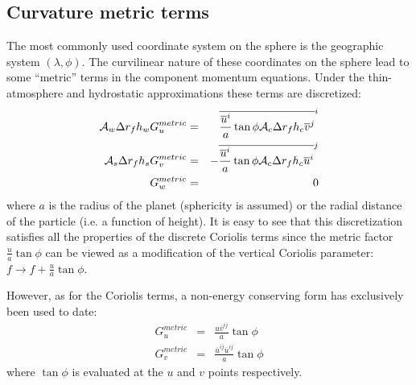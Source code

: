 

\subsection{Curvature metric terms}

The most commonly used coordinate system on the sphere is the
geographic system $(\lambda,\phi)$. The curvilinear nature of these
coordinates on the sphere lead to some ``metric'' terms in the
component momentum equations. Under the thin-atmosphere and
hydrostatic approximations these terms are discretized:
\begin{eqnarray}
{\cal A}_w \Delta r_f h_w G_u^{metric} & = &
  \overline{ \frac{ \overline{u}^i }{a} \tan{\phi} {\cal A}_c \Delta r_f h_c \overline{ v }^j }^i \\
{\cal A}_s \Delta r_f h_s G_v^{metric} & = &
- \overline{ \frac{ \overline{u}^i }{a} \tan{\phi} {\cal A}_c \Delta r_f h_c \overline{ u }^i }^j \\
G_w^{metric} & = & 0
\end{eqnarray}
where $a$ is the radius of the planet (sphericity is assumed) or the
radial distance of the particle (i.e. a function of height).  It is
easy to see that this discretization satisfies all the properties of
the discrete Coriolis terms since the metric factor $\frac{u}{a}
\tan{\phi}$ can be viewed as a modification of the vertical Coriolis
parameter: $f \rightarrow f+\frac{u}{a} \tan{\phi}$.

However, as for the Coriolis terms, a non-energy conserving form has
exclusively been used to date:
\begin{eqnarray}
G_u^{metric} & = & \frac{u \overline{v}^{ij} }{a} \tan{\phi} \\
G_v^{metric} & = & \frac{ \overline{u}^{ij} \overline{u}^{ij}}{a} \tan{\phi}
\end{eqnarray}
where $\tan{\phi}$ is evaluated at the $u$ and $v$ points
respectively.





